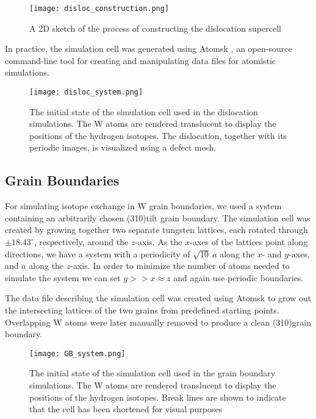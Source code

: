 \begin{figure}[!ht]
\center
\texttt{[image: disloc\_construction.png]}
\caption{A 2D sketch of the process of constructing the dislocation supercell}
\label{Fig:disloc_construction}
\end{figure}

In practice, the simulation cell was generated using Atomsk \cite{hirel2015atomsk}, an open-source command-line tool for creating and manipulating data files for atomistic simulations. 

\begin{figure}[!ht]
\center
\texttt{[image: disloc\_system.png]}
\caption{The initial state of the simulation cell used in the dislocation simulations. 
The W atoms are rendered translucent to display the positions of the hydrogen isotopes. 
The dislocation, together with its periodic images, is visualized using a defect mesh.}
\label{Fig:disloc_system}
\end{figure}

\subsection{Grain Boundaries}
For simulating isotope exchange in W grain boundaries, we used a system containing an arbitrarily chosen \hkl(310)\hkl[001] tilt grain boundary. 
The simulation cell was created by growing together two separate tungsten lattices, each rotated through $\pm18.43^\circ$, respectively, around the $z$-axis. 
As the $x$-axes of the lattices point along  directions, we have a system with a periodicity of $\sqrt{10}~a$ along the $x$- and $y$-axes, and $a$ along the $z$-axis. 
In order to minimize the number of atoms needed to simulate the system we can set $y >> x \approx z$ and again use periodic boundaries.


The data file describing the simulation cell was created using Atomsk \cite{hirel2015atomsk} to grow out the intersecting lattices of the two grains from predefined starting points. 
Overlapping W atoms were later manually removed to produce a clean \hkl(310)\hkl[001] grain boundary.

\begin{figure}[!ht]
\center
\texttt{[image: GB\_system.png]}
\caption{The initial state of the simulation cell used in the grain boundary simulations. 
The W atoms are rendered translucent to display the positions of the hydrogen isotopes. Break lines are shown to indicate that the cell has been shortened for visual purposes}
\label{Fig:GB_system}
\end{figure}

